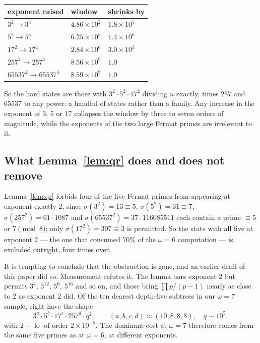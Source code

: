 \documentclass[11pt]{amsart}
\theoremstyle{remark}
\DeclareMathOperator{\lo}{lo}
\begin{document}
\begin{table}[h]
\centering
\begin{tabular}{lll}
\toprule
exponent raised & window & shrinks by \\
\midrule
$3^{2} \to 3^{4}$         & $4.86 \times 10^{2}$ & $1.8 \times 10^{7}$ \\
$5^{2} \to 5^{4}$         & $6.25 \times 10^{3}$ & $1.4 \times 10^{6}$ \\
$17^{2} \to 17^{4}$       & $2.84 \times 10^{6}$ & $3.0 \times 10^{3}$ \\
$257^{2} \to 257^{4}$     & $8.56 \times 10^{9}$ & $1.0$ \\
$65537^{2} \to 65537^{4}$ & $8.59 \times 10^{9}$ & $1.0$ \\
\bottomrule
\end{tabular}
\end{table}

So the hard states are those with $3^{2} \cdot 5^{2} \cdot 17^{2}$ dividing $n$
exactly, times $257$ and $65537$ to any power: a handful of states rather than a
family. Any increase in the exponent of $3$, $5$ or $17$ collapses the window by
three to seven orders of magnitude, while the exponents of the two large Fermat
primes are irrelevant to it.

\subsection{What Lemma~\ref{lem:qr} does and does not remove}
\label{sec:fermat-alive}
Lemma~\ref{lem:qr} forbids four of the five Fermat primes from appearing at
exponent exactly $2$, since $\sigma(3^{2}) = 13 \equiv 5$,
$\sigma(5^{2}) = 31 \equiv 7$, $\sigma(257^{2}) = 61 \cdot 1087$ and
$\sigma(65537^{2}) = 37 \cdot 116085511$ each contain a prime $\equiv 5$ or
$7 \pmod 8$; only $\sigma(17^{2}) = 307 \equiv 3$ is permitted. So the state with
all five at exponent $2$ --- the one that consumed $70\%$ of the $\omega = 6$
computation --- is excluded outright, four times over.

It is tempting to conclude that the obstruction is gone, and an earlier draft of
this paper did so. Measurement refutes it. The lemma bars exponent $2$ but
permits $3^{4}$, $3^{12}$, $5^{6}$, $5^{16}$ and so on, and those bring
$\prod p/(p-1)$ nearly as close to $2$ as exponent $2$ did. Of the ten dearest
depth-five subtrees in our $\omega = 7$ sample, eight have the shape
\[
  3^{a} \cdot 5^{b} \cdot 17^{c} \cdot 257^{d} \cdot q^{2},
  \qquad (a,b,c,d) \approx (10, 8, 8, 8), \quad q \sim 10^{5},
\]
with $2 - \lo$ of order $2 \times 10^{-5}$. The dominant cost at $\omega = 7$
therefore comes from the same five primes as at $\omega = 6$, at different
exponents.
\end{document}
